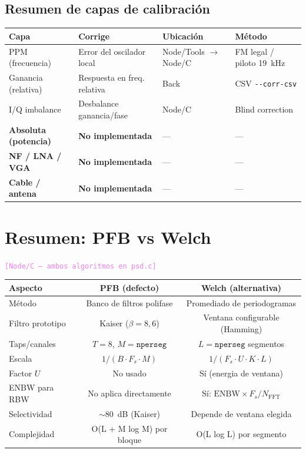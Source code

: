 \documentclass[11pt,a4paper]{article}
\newcommand{\where}[1]{\textcolor{violet}{\texttt{[#1]}}}
\begin{document}
\subsection{Resumen de capas de calibración}

\begin{center}
\begin{tabular}{llll}
\toprule
\textbf{Capa} & \textbf{Corrige} & \textbf{Ubicación} & \textbf{Método} \\
\midrule
PPM (frecuencia) & Error del oscilador local & Node/Tools $\to$ Node/C & FM legal / piloto 19~kHz \\
Ganancia (relativa) & Respuesta en freq. relativa & Back & CSV \texttt{-{}-corr-csv} \\
I/Q imbalance & Desbalance ganancia/fase & Node/C & Blind correction \\
\midrule
\textbf{Absoluta (potencia)} & \textbf{No implementada} & --- & --- \\
\textbf{NF / LNA / VGA} & \textbf{No implementada} & --- & --- \\
\textbf{Cable / antena} & \textbf{No implementada} & --- & --- \\
\bottomrule
\end{tabular}
\end{center}

\section{Resumen: PFB vs Welch}
\label{sec:pfb_vs_welch}

\where{Node/C — ambos algoritmos en \texttt{psd.c}}

\begin{center}
\small
\begin{tabular}{lcc}
\toprule
\textbf{Aspecto} & \textbf{PFB (defecto)} & \textbf{Welch (alternativa)} \\
\midrule
Método & Banco de filtros polifase & Promediado de periodogramas \\
Filtro prototipo & Kaiser ($\beta = 8{,}6$) & Ventana configurable (Hamming) \\
Taps/canales & $T = 8$, $M = \texttt{nperseg}$ & $L = \texttt{nperseg}$ segmentos \\
Escala & $1/(B \cdot F_s \cdot M)$ & $1/(F_s \cdot U \cdot K \cdot L)$ \\
Factor $U$ & No usado & Sí (energia de ventana) \\
ENBW para RBW & No aplica directamente & Sí: $\text{ENBW} \times F_s / N_{\text{FFT}}$ \\
Selectividad & $\sim 80$~dB (Kaiser) & Depende de ventana elegida \\
Complejidad & O(L + M log M) por bloque & O(L log L) por segmento \\
\bottomrule
\end{tabular}
\end{center}
\end{document}
